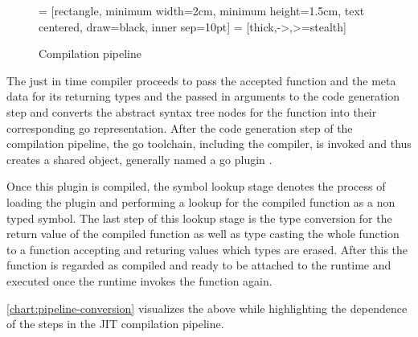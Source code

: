 \begin{figure}[H]
     = [rectangle, minimum width=2cm, minimum height=1.5cm, text centered, draw=black, inner sep=10pt]
     = [thick,->,>=stealth]
    \centering
    \caption{Compilation pipeline}
    \label{chart:pipeline-conversion}
\end{figure}

The just in time compiler proceeds to pass the accepted function and the
meta data for its returning types and the passed in arguments to the code
generation step and converts the abstract syntax tree nodes for the function
into their corresponding go representation. After the code generation step
of the compilation pipeline, the go toolchain, including the compiler, is
invoked and thus creates a shared object, generally named a go plugin
\cite{go_plugin}.

Once this plugin is compiled, the symbol lookup stage denotes the process of
loading the plugin and performing a lookup for the compiled function as a
non typed symbol. The last step of this lookup stage is the type conversion
for the return value of the compiled function as well as type casting the
whole function to a function accepting and returing values which types are
erased. After this the function is regarded as compiled and ready to be
attached to the runtime and executed once the runtime invokes the function
again.

\autoref{chart:pipeline-conversion} visualizes the above while highlighting
the dependence of the steps in the JIT compilation pipeline.

